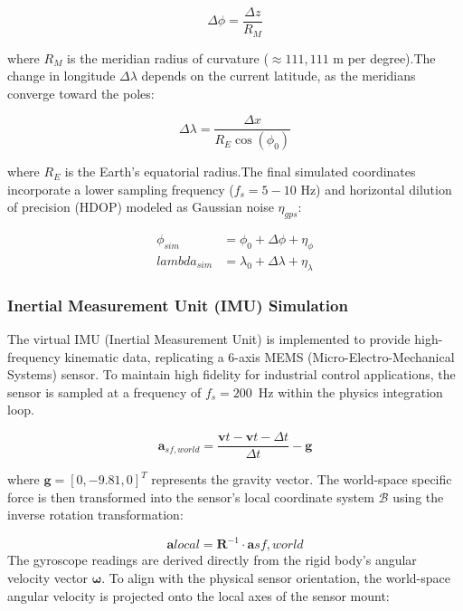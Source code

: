 \begin{equation}
    \Delta \phi = \frac{\Delta z}{R_M}
\end{equation}

where $R_M$ is the meridian radius of curvature ($\approx 111,111$ m per degree).The change in longitude $\Delta \lambda$ depends on the current latitude, as the meridians converge toward the poles:

\begin{equation}
    \Delta \lambda = \frac{\Delta x}{R_E \cos(\phi_0)}
\end{equation}

where $R_E$ is the Earth's equatorial radius.The final simulated coordinates incorporate a lower sampling frequency ($f_s = 5-10$ Hz) and horizontal dilution of precision (HDOP) modeled as Gaussian noise $\eta_{gps}$:

\begin{align}
    \phi_{sim} &= \phi_0 + \Delta \phi + \eta_{\phi} \\lambda_{sim} &= \lambda_0 + \Delta \lambda + \eta_{\lambda}
\end{align}






\subsubsection{Inertial Measurement Unit (IMU) Simulation }

The virtual IMU (Inertial Measurement Unit) is implemented to provide 
high-frequency kinematic data, replicating a 6-axis MEMS (Micro-Electro-Mechanical Systems) sensor. 
To maintain high fidelity for industrial control applications, the sensor is sampled at a frequency of $f_s = 200$~Hz within the physics integration loop. 

\begin{equation}
    \mathbf{a}_{sf, world} = \frac{\mathbf{v}t - \mathbf{v}{t-\Delta t}}{\Delta t} - \mathbf{g}
\end{equation}

where $\mathbf{g} = [0, -9.81, 0]^T$ represents the gravity vector. The world-space specific force is then transformed into the sensor's local coordinate system $\mathcal{B}$ using the inverse rotation transformation:

\begin{equation}
    \mathbf{a}{local} = \mathbf{R}^{-1} \cdot \mathbf{a}{sf, world}
\end{equation}
The gyroscope readings are derived directly from the rigid body's angular velocity vector $\mathbf{\omega}$. To align with the physical sensor orientation, the world-space angular velocity is projected onto the local axes of the sensor mount:

